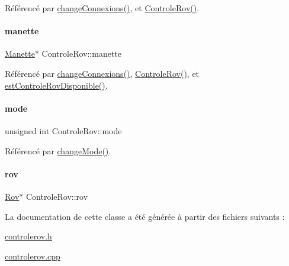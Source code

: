 Référencé par \hyperlink{class_controle_rov_a400d5766b9acabb45c1af5f8b22bbe47}{change\+Connexions()}, et \hyperlink{class_controle_rov_acc4d5fea26770217df978d43df2ad51e}{Controle\+Rov()}.

\mbox{\label{class_controle_rov_af5caffd78d06f90d045b53ee87ad76df}} 
\paragraph{\texorpdfstring{manette}{manette}}
{\footnotesize\ttfamily \hyperlink{class_manette}{Manette}$\ast$ Controle\+Rov\+::manette\hspace{0.3cm}{\ttfamily [private]}}



Référencé par \hyperlink{class_controle_rov_a400d5766b9acabb45c1af5f8b22bbe47}{change\+Connexions()}, \hyperlink{class_controle_rov_acc4d5fea26770217df978d43df2ad51e}{Controle\+Rov()}, et \hyperlink{class_controle_rov_a9531520e50479fc2e339cd43f4c87066}{est\+Controle\+Rov\+Disponible()}.

\mbox{\label{class_controle_rov_a5d1fb6ad14da49e3c587199ae86dc28d}} 
\paragraph{\texorpdfstring{mode}{mode}}
{\footnotesize\ttfamily unsigned int Controle\+Rov\+::mode\hspace{0.3cm}{\ttfamily [private]}}



Référencé par \hyperlink{class_controle_rov_a206d52adf49b8510316b2885ea6b98b0}{change\+Mode()}.

\mbox{\label{class_controle_rov_a3620b701fbb3aebe6a57ca3f3f04c6ca}} 
\paragraph{\texorpdfstring{rov}{rov}}
{\footnotesize\ttfamily \hyperlink{class_rov}{Rov}$\ast$ Controle\+Rov\+::rov\hspace{0.3cm}{\ttfamily [private]}}



La documentation de cette classe a été générée à partir des fichiers suivants \+:\begin{DoxyCompactItemize}
\item 
\hyperlink{controlerov_8h}{controlerov.\+h}\item 
\hyperlink{controlerov_8cpp}{controlerov.\+cpp}\end{DoxyCompactItemize}

